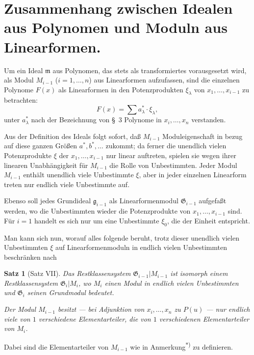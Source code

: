 \documentclass[fontsize=10pt,paper=a5,pagesize,headings=small]{scrbook}
\newcommand{\ideal}[1]{\mathfrak{#1}}
\theoremstyle{plain}
\newtheorem*{satz}{Satz}
\begin{document}
\section{Zusammenhang zwischen Idealen aus Polynomen und Moduln aus Linearformen.}
\setcounter{section}{4}

Um ein Ideal $\ideal{m}$ aus Polynomen, das stets als transformiertes vorausgesetzt wird,
als Modul $M_{i-1}$ ($i=1,\dots,n$) aus Linearformen aufzufassen, sind die einzelnen Polynome
$F(x)$ als Linearformen in den Potenzprodukten $\xi_\lambda$ von $x_1,\dots,x_{i-1}$ zu betrachten:
\[ F(x) = \sum a_\lambda^* \cdot \xi_\lambda, \]
unter $a_\lambda^*$ nach der Bezeichnung von \S~3 Polynome in $x_i,\dots,x_n$ verstanden.

Aus der Definition des Ideals folgt sofort, daß $M_{i-1}$ Moduleigenschaft in bezug auf
diese ganzen Größen $a^*, b^*,\dots$ zukommt; da ferner die unendlich vielen Potenzprodukte
$\xi$ der $x_1,\dots,x_{i-1}$ nur linear auftreten, spielen sie wegen ihrer linearen Unabhängigkeit
für $M_{i-1}$ die Rolle von Unbestimmten. Jeder Modul $M_{i-1}$ enthält unendlich viele
Unbestimmte $\xi$, aber in jeder einzelnen Linearform treten nur endlich viele Unbestimmte
auf.

Ebenso soll jedes Grundideal $\ideal{g}_{i-1}$ als Linearformenmodul $\mathfrak{G}_{i-1}$ aufgefaßt werden, wo
die Unbestimmten wieder die Potenzprodukte von $x_1,\dots,x_{i-1}$ sind. Für $i=1$ handelt
es sich nur um eine Unbestimmte $\xi_0$, die der Einheit entspricht.

\newpage
\setcounter{page}{434}

Man kann sich nun, worauf alles folgende beruht, trotz dieser unendlich vielen
Unbestimmten $\xi$ auf Linearformenmoduln in endlich vielen Unbestimmten beschränken nach

\begin{satz}[Satz VII]
Das Restklassensystem $\mathfrak{G}_{i-1}|M_{i-1}$ ist isomorph einem Restklassensystem
$\mathfrak{G}_i|M_i$, wo $M_i$ einen Modul in endlich vielen Unbestimmten und $\mathfrak{G}_i$ seinen Grundmodul
bedeutet.

Der Modul $M_{i-1}$ besitzt --- bei Adjunktion von $x_i,\dots,x_n$ zu $P(u)$ --- nur endlich
viele von $1$ verschiedene Elementarteiler, die von $1$ verschiedenen Elementarteiler von $M_i$.
\end{satz}

Dabei sind die Elementarteiler von $M_{i-1}$ wie in Anmerkung\textsuperscript{$*$)} zu definieren.
\end{document}
